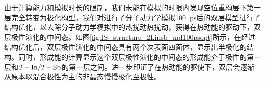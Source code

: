 由于计算能力和模拟时长的限制，我们未能在模拟的时限内发现空位重构层下第一层完全转变为极化构型。我们对进行了分子动力学模拟\SI{100}{\pico\second}后的双层模型进行了结构优化，以去除分子动力学模拟中的热扰动热扰动，获得在热动能的驱动下，双层极性演化的中间态。如图\ref{fig:IS_structure_2Linsb_md100psopt}所示，在经过结构优化后，双层极性演化的中间态具有两个次表面四面体，显示出半极化的结构。同时，形成能的计算显示这个双层极性演化的中间态的形成能介于极性的第一层和$\rm 2-In/2-Sb$的第一层之间。进一步印证了在热动能的驱使下，双层会逐渐从原本以混合极性为主的非晶态慢慢极化至极性。

\begin{figure}[!htb]
    \\[-0.5ex]
\end{figure}
